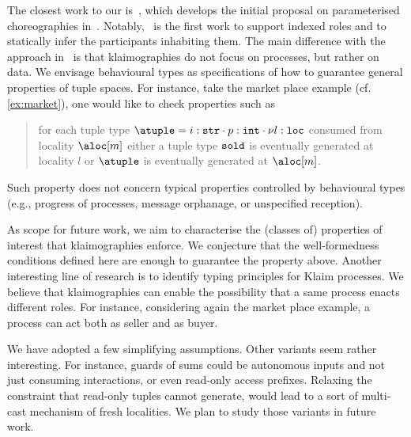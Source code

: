The closest work to our is~\cite{chjny19}, which develops the initial
proposal on parameterised choreographies in~\cite{ydbh10,dybh12}.
%
Notably,~\cite{chjny19} is the first work to support indexed roles and
to statically infer the participants inhabiting them.
%
The main difference with the approach in~\cite{chjny19} is that
klaimographies do not focus on processes, but rather on data.
%
We envisage behavioural types as specifications of how to guarantee
general properties of tuple spaces.
%
For instance, take the market place example (cf. \cref{ex:market}),
one would like to check properties such as
\begin{quote}
  for each tuple type
  $\atuple = {{i : \asort[str]} \cdot {p : \asort[int]} \cdot {\nu l :
      \asort[loc]}}$ consumed from locality $\aloc[m]$ either a tuple type
  $\asort[sold]$ is eventually generated at locality $l$ or $\atuple$
  is eventually generated at $\aloc[m]$.
\end{quote}
%
Such property does not concern typical properties
controlled by behavioural types (e.g., progress of processes, message
orphanage, or unspecified reception).

As scope for future work, we aim to characterise the (classes of)
properties of interest that klaimographies enforce.
%
We conjecture that the well-formedness conditions defined here
are enough to guarantee the property above.
%
Another interesting line of research is to identify typing principles
for Klaim processes.
%
We believe that klaimographies can enable the possibility that a same
process enacts different roles.
%
For instance, considering again the market place example, a process
can act both as seller and as buyer.

We have adopted a few simplifying assumptions.
%
Other variants seem rather interesting.
%
For instance, guards of sums could be autonomous inputs and not just
consuming interactions, or even read-only access prefixes.
%
Relaxing the constraint that read-only tuples cannot generate, would
lead to a sort of multi-cast mechanism of fresh localities.
%
We plan to study those variants in future work.


